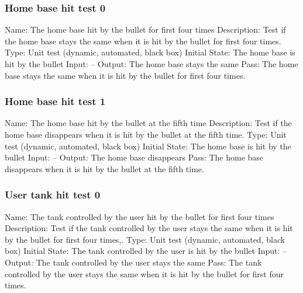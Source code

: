 \documentclass{article}
\begin{document}
\subsubsection{Home base hit test 0}
Name:  The home base hit by the bullet for first four times\newline
Description: Test if the home base stays the same when it is hit by the bullet 
for first four times. \newline
Type: Unit test (dynamic, automated, black box) \newline
Initial State:  The home base is hit by the bullet \newline
Input: --\newline
Output: The home base stays the same \newline
Pass:  The home base stays the same when it is hit by the bullet for first 
four times. \newline


\subsubsection{Home base hit test 1}
Name: The home base hit by the bullet at the fifth time\newline
Description: Test if the home base disappears when it is hit by the bullet  at 
the fifth time. \newline
Type: Unit test (dynamic, automated, black box) \newline
Initial State:  The home base is hit by the bullet \newline
Input: --\newline
Output: The home base disappears\newline
Pass: The home base disappears when it is hit by the bullet  at the fifth 
time. \newline

\subsubsection{User tank hit test 0}
Name: The tank controlled by the user hit by the bullet for first four times
\newline
Description: Test if the tank controlled by the user stays the same when it is 
hit by the bullet for first four times,. \newline
Type: Unit test (dynamic, automated, black box) \newline
Initial State:  The tank controlled by the user is hit by the bullet \newline
Input: --\newline
Output: The tank controlled by the user stays the same \newline
Pass: The tank controlled by the user stays the same when it is hit by the 
bullet for first four times. \newline
\end{document}
